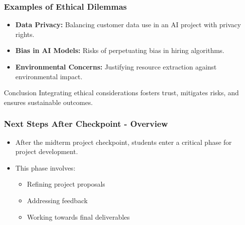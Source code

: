\documentclass[aspectratio=169]{beamer}
\begin{document}
\begin{frame}[fragile]
    \frametitle{Examples of Ethical Dilemmas}
    \begin{itemize}
        \item \textbf{Data Privacy:} Balancing customer data use in an AI project with privacy rights.
        \item \textbf{Bias in AI Models:} Risks of perpetuating bias in hiring algorithms.
        \item \textbf{Environmental Concerns:} Justifying resource extraction against environmental impact.
    \end{itemize}
    \begin{block}{Conclusion}
        Integrating ethical considerations fosters trust, mitigates risks, and ensures sustainable outcomes.
    \end{block}
\end{frame}

\begin{frame}[fragile]
    \frametitle{Next Steps After Checkpoint - Overview}
    \begin{itemize}
        \item After the midterm project checkpoint, students enter a critical phase for project development.
        \item This phase involves:
            \begin{itemize}
                \item Refining project proposals
                \item Addressing feedback
                \item Working towards final deliverables
            \end{itemize}
    \end{itemize}
\end{frame}
\end{document}

